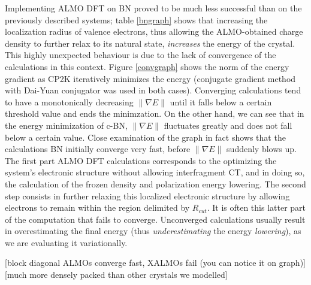 \documentclass[aps,prb,twocolumn,amsmath,amssymb,superscriptaddress,longbibliography]{revtex4-1}
\begin{document}
Implementing ALMO DFT on BN proved to be much less successful than on the previously described systems; table \ref{bngraph} shows that increasing the localization radius of valence electrons, thus allowing the ALMO-obtained charge density to further relax to its natural state, \emph{increases} the energy of the crystal.
This highly unexpected behaviour is due to the lack of convergence of the calculations in this context. 
Figure \ref{convgraph} shows the norm of the energy gradient as CP2K iteratively minimizes the energy (conjugate gradient method with Dai-Yuan conjugator was used in both cases). 
Converging calculations tend to have a monotonically decreasing $\|\nabla E\|$ until it falls below a certain threshold value and ends the minimzation. 
On the other hand, we can see that in the energy minimization of c-BN, $\|\nabla E\|$ fluctuates greatly and does not fall below a certain value.
Close examination of the graph in fact shows that the calculations BN initially converge very fast, before $\|\nabla E\|$ suddenly blows up.
The first part ALMO DFT calculations corresponds to the optimizing the system's electronic structure without allowing interfragment CT, and in doing so, the calculation of the frozen density and polarization energy lowering. 
The second step consists in further relaxing this localized electronic structure by allowing electrons to remain within the region delimited by $R_{cut}$.
It is often this latter part of the computation that fails to converge.
Unconverged calculations usually result in overestimating the final energy (thus \emph{underestimating} the energy \emph{lowering}), as we are evaluating it variationally.


[block diagonal ALMOs converge fast, XALMOs fail (you can notice it on graph)]
[much more densely packed than other crystals we modelled]
\end{document}
